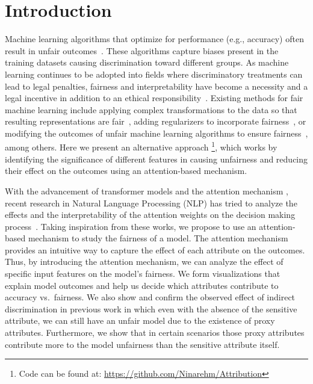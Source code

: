\section{Introduction}


Machine learning algorithms that optimize for performance (e.g., accuracy) often result in unfair outcomes~\cite{10.1145/3457607}. These algorithms capture biases present in the training datasets causing discrimination toward different groups. As machine learning continues to be adopted into fields where discriminatory treatments can lead to legal penalties, fairness and interpretability have become a necessity and a legal incentive in addition to an ethical responsibility~\cite{barocas2016big,hacker2020explainable}. Existing methods for fair machine learning include applying complex transformations to the data so that resulting representations are fair~\cite{gupta2021controllable,NEURIPS2018_415185ea,roy2019mitigating,advforg, pmlr-v89-song19a}, adding  regularizers to incorporate fairness~\cite{pmlr-v54-zafar17a,kamishima2012fairness,mehrabi2020statistical}, or modifying the outcomes of unfair machine learning algorithms to ensure fairness~\cite{NIPS2016_9d268236}, among others. Here we present an alternative approach \footnote{Code can be found at: \url{https://github.com/Ninarehm/Attribution}}, which works by identifying the significance of different features in causing unfairness and reducing their effect on the outcomes using an attention-based mechanism.


With the advancement of transformer models and the attention mechanism \cite{NIPS2017_3f5ee243}, recent research in Natural Language Processing (NLP) has tried to analyze the effects and the interpretability of the attention weights on the decision making process~\cite{wiegreffe-pinter-2019-attention,jain-wallace-2019-attention,serrano-smith-2019-attention,hao2021self}. Taking inspiration from these works, we propose to use an attention-based mechanism to study the fairness of a model. The attention mechanism provides an intuitive way to capture the effect of each attribute on the outcomes. Thus, by introducing the attention mechanism, we can analyze the effect of specific input features on the model's fairness. We form visualizations that explain model outcomes and help us decide which attributes contribute to accuracy vs.\ fairness. We also show and confirm the observed effect of indirect discrimination in previous work \cite{zliobaite2015survey,6175897,ijcai2017-549} in which even with the absence of the sensitive attribute, we can still have an unfair model due to the existence of proxy attributes. Furthermore, we show that in certain scenarios those proxy attributes contribute more to the model unfairness than the sensitive attribute itself.

